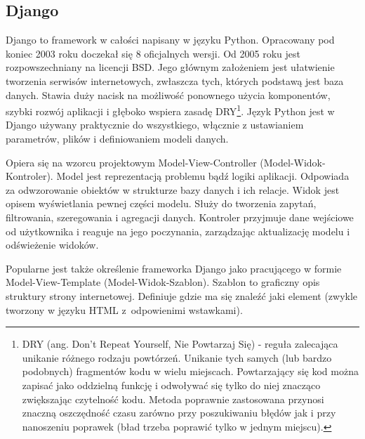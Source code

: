\documentclass[]{mgr}
\begin{document}
            \subsection{Django}
            Django to framework w całości napisany w języku Python. Opracowany pod koniec 2003 roku doczekał się 8 oficjalnych wersji. Od 2005 roku jest rozpowszechniany na licencji BSD. Jego głównym założeniem jest ułatwienie tworzenia serwisów internetowych, zwłaszcza tych, których podstawą jest baza danych. Stawia duży nacisk na możliwość ponownego użycia komponentów, szybki rozwój aplikacji i głęboko wspiera zasadę DRY\footnote{DRY (ang. Don't Repeat Yourself, Nie Powtarzaj Się) - reguła zalecająca unikanie różnego rodzaju powtórzeń. Unikanie tych samych (lub bardzo podobnych) fragmentów kodu w wielu miejscach. Powtarzający się kod można zapisać jako oddzielną funkcję i odwoływać się tylko do niej znacząco zwiększając czytelność kodu. Metoda poprawnie zastosowana przynosi znaczną oszczędność czasu zarówno przy poszukiwaniu błędów jak i przy nanoszeniu poprawek (bład trzeba poprawić tylko w jednym miejscu).}. Język Python jest w Django używany praktycznie do wszystkiego, włącznie z ustawianiem parametrów, plików i definiowaniem modeli danych.

            Opiera się na wzorcu projektowym Model-View-Controller (Model-Widok-Kontroler). Model jest reprezentacją problemu bądź logiki aplikacji. Odpowiada za odwzorowanie obiektów w strukturze bazy danych i ich relacje. Widok jest opisem wyświetlania pewnej części modelu. Służy do tworzenia zapytań, filtrowania, szeregowania i agregacji danych. Kontroler przyjmuje dane wejściowe od użytkownika i reaguje na jego poczynania, zarządzając aktualizację modelu i odświeżenie widoków.

            Popularne jest także określenie frameworka Django jako pracującego w formie Model-View-Template (Model-Widok-Szablon). Szablon to graficzny opis struktury strony internetowej. Definiuje gdzie ma się znaleźć jaki element (zwykle tworzony w języku HTML z~odpowienimi wstawkami).
\end{document}
